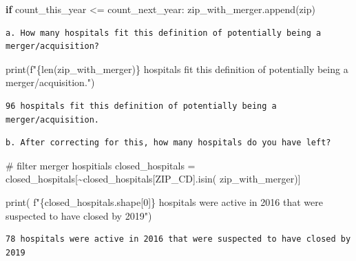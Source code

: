 \documentclass[
  letterpaper,
  DIV=11,
  numbers=noendperiod]{scrartcl}
\newenvironment{Shaded}{\begin{snugshade}}{\end{snugshade}}
\newcommand{\BuiltInTok}[1]{\textcolor[rgb]{0.00,0.23,0.31}{#1}}
\newcommand{\CommentTok}[1]{\textcolor[rgb]{0.37,0.37,0.37}{#1}}
\newcommand{\ControlFlowTok}[1]{\textcolor[rgb]{0.00,0.23,0.31}{\textbf{#1}}}
\newcommand{\DecValTok}[1]{\textcolor[rgb]{0.68,0.00,0.00}{#1}}
\newcommand{\NormalTok}[1]{\textcolor[rgb]{0.00,0.23,0.31}{#1}}
\newcommand{\OperatorTok}[1]{\textcolor[rgb]{0.37,0.37,0.37}{#1}}
\newcommand{\SpecialCharTok}[1]{\textcolor[rgb]{0.37,0.37,0.37}{#1}}
\newcommand{\SpecialStringTok}[1]{\textcolor[rgb]{0.13,0.47,0.30}{#1}}
\newcommand{\StringTok}[1]{\textcolor[rgb]{0.13,0.47,0.30}{#1}}
\begin{document}
\begin{Shaded}
\begin{Highlighting}[]
        \ControlFlowTok{if}\NormalTok{ count\_this\_year }\OperatorTok{\textless{}=}\NormalTok{ count\_next\_year:}
\NormalTok{            zip\_with\_merger.append(}\BuiltInTok{zip}\NormalTok{)}
\end{Highlighting}
\end{Shaded}

\begin{verbatim}
a. How many hospitals fit this definition of potentially being a merger/acquisition?
\end{verbatim}

\begin{Shaded}
\begin{Highlighting}[]
\BuiltInTok{print}\NormalTok{(}\SpecialStringTok{f"}\SpecialCharTok{\{}\BuiltInTok{len}\NormalTok{(zip\_with\_merger)}\SpecialCharTok{\}}\SpecialStringTok{ hospitals fit this definition of potentially being a merger/acquisition."}\NormalTok{)}
\end{Highlighting}
\end{Shaded}

\begin{verbatim}
96 hospitals fit this definition of potentially being a merger/acquisition.
\end{verbatim}

\begin{verbatim}
b. After correcting for this, how many hospitals do you have left?
\end{verbatim}

\begin{Shaded}
\begin{Highlighting}[]
\CommentTok{\# filter merger hospitials}
\NormalTok{closed\_hospitals }\OperatorTok{=}\NormalTok{ closed\_hospitals[}\OperatorTok{\textasciitilde{}}\NormalTok{closed\_hospitals[}\StringTok{\textquotesingle{}ZIP\_CD\textquotesingle{}}\NormalTok{].isin(}
\NormalTok{    zip\_with\_merger)]}

\BuiltInTok{print}\NormalTok{(}
    \SpecialStringTok{f"}\SpecialCharTok{\{}\NormalTok{closed\_hospitals}\SpecialCharTok{.}\NormalTok{shape[}\DecValTok{0}\NormalTok{]}\SpecialCharTok{\}}\SpecialStringTok{ hospitals were active in 2016 that were suspected to have closed by 2019"}\NormalTok{)}
\end{Highlighting}
\end{Shaded}

\begin{verbatim}
78 hospitals were active in 2016 that were suspected to have closed by 2019
\end{verbatim}
\end{document}
